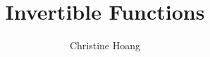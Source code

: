 \documentclass{article}
\title{Invertible Functions}
\author{Christine Hoang}
\begin{document}
\maketitle

\section{}
\end{document}
